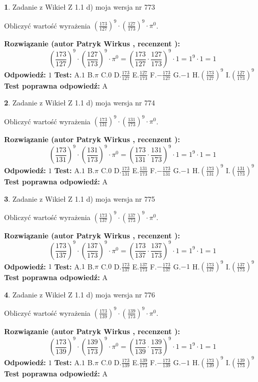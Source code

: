 \documentclass[12pt, a4paper]{article}
\theoremstyle{definition} %
\newtheorem{zad}{}
\newcommand{\zadStart}[1]{\begin{zad}#1\newline}
\newcommand{\zadStop}{\end{zad}}
\newcommand{\rozwStart}[2]{\noindent \textbf{Rozwiązanie (autor #1 , recenzent #2): }\newline}
\newcommand{\rozwStop}{\newline}
\newcommand{\odpStart}{\noindent \textbf{Odpowiedź:}\newline}
\newcommand{\odpStop}{\newline}
\newcommand{\testStart}{\noindent \textbf{Test:}\newline}
\newcommand{\testStop}{\newline}
\newcommand{\kluczStart}{\noindent \textbf{Test poprawna odpowiedź:}\newline}
\newcommand{\kluczStop}{\newline}
\begin{document}
\zadStart{Zadanie z Wikieł Z 1.1 d) moja wersja nr 773}

Obliczyć wartość wyrażenia $(\frac{173}{127})^{9} \cdot (\frac{127}{173})^{9} \cdot \pi^{0}$.
\zadStop
\rozwStart{Patryk Wirkus}{}
$$(\frac{173}{127})^{9} \cdot (\frac{127}{173})^{9} \cdot \pi^{0} = (\frac{173}{127} \cdot \frac{127}{173})^{9} \cdot 1 = 1^{9} \cdot 1 = 1$$
\rozwStop
\odpStart
$1$
\odpStop
\testStart
A.$1$ B.$\pi$ C.$0$ D.$\frac{173}{127}$ E.$\frac{127}{173}$
F.$-\frac{173}{127}$ G.$-1$
H.$(\frac{173}{127})^{9}$
I.$(\frac{127}{173})^{9}$
\testStop
\kluczStart
A
\kluczStop



\zadStart{Zadanie z Wikieł Z 1.1 d) moja wersja nr 774}

Obliczyć wartość wyrażenia $(\frac{173}{131})^{9} \cdot (\frac{131}{173})^{9} \cdot \pi^{0}$.
\zadStop
\rozwStart{Patryk Wirkus}{}
$$(\frac{173}{131})^{9} \cdot (\frac{131}{173})^{9} \cdot \pi^{0} = (\frac{173}{131} \cdot \frac{131}{173})^{9} \cdot 1 = 1^{9} \cdot 1 = 1$$
\rozwStop
\odpStart
$1$
\odpStop
\testStart
A.$1$ B.$\pi$ C.$0$ D.$\frac{173}{131}$ E.$\frac{131}{173}$
F.$-\frac{173}{131}$ G.$-1$
H.$(\frac{173}{131})^{9}$
I.$(\frac{131}{173})^{9}$
\testStop
\kluczStart
A
\kluczStop



\zadStart{Zadanie z Wikieł Z 1.1 d) moja wersja nr 775}

Obliczyć wartość wyrażenia $(\frac{173}{137})^{9} \cdot (\frac{137}{173})^{9} \cdot \pi^{0}$.
\zadStop
\rozwStart{Patryk Wirkus}{}
$$(\frac{173}{137})^{9} \cdot (\frac{137}{173})^{9} \cdot \pi^{0} = (\frac{173}{137} \cdot \frac{137}{173})^{9} \cdot 1 = 1^{9} \cdot 1 = 1$$
\rozwStop
\odpStart
$1$
\odpStop
\testStart
A.$1$ B.$\pi$ C.$0$ D.$\frac{173}{137}$ E.$\frac{137}{173}$
F.$-\frac{173}{137}$ G.$-1$
H.$(\frac{173}{137})^{9}$
I.$(\frac{137}{173})^{9}$
\testStop
\kluczStart
A
\kluczStop



\zadStart{Zadanie z Wikieł Z 1.1 d) moja wersja nr 776}

Obliczyć wartość wyrażenia $(\frac{173}{139})^{9} \cdot (\frac{139}{173})^{9} \cdot \pi^{0}$.
\zadStop
\rozwStart{Patryk Wirkus}{}
$$(\frac{173}{139})^{9} \cdot (\frac{139}{173})^{9} \cdot \pi^{0} = (\frac{173}{139} \cdot \frac{139}{173})^{9} \cdot 1 = 1^{9} \cdot 1 = 1$$
\rozwStop
\odpStart
$1$
\odpStop
\testStart
A.$1$ B.$\pi$ C.$0$ D.$\frac{173}{139}$ E.$\frac{139}{173}$
F.$-\frac{173}{139}$ G.$-1$
H.$(\frac{173}{139})^{9}$
I.$(\frac{139}{173})^{9}$
\testStop
\kluczStart
A
\kluczStop
\end{document}
